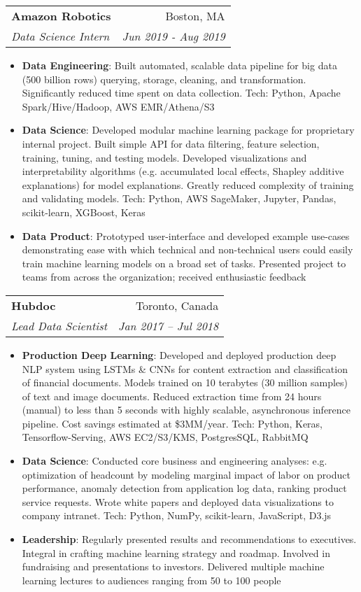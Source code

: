 \documentclass[letterpaper,11pt]{article}
\makeatletter
\newcommand{\resumeItem}[2]{
  \item\small{
    \textbf{#1}{: #2 \vspace{-2pt}}
  }
}
\newcommand{\resumeSubheading}[4]{
  \vspace{-1pt}\item
    \begin{tabular*}{0.97\textwidth}[t]{l@{\extracolsep{\fill}}r}
      \textbf{#1} & #2 \\
      \textit{\small#3} & \textit{\small #4} \\
    \end{tabular*}\vspace{-5pt}
}
\newcommand{\resumeItemListStart}{\begin{itemize}}
\newcommand{\resumeItemListEnd}{\end{itemize}\vspace{-5pt}}
\makeatother
\begin{document}
  \resumeSubheading
    {Amazon Robotics}{Boston, MA}
    {Data Science Intern}{Jun 2019 - Aug 2019}
    \resumeItemListStart
      \resumeItem{Data Engineering}
        {Built automated, scalable data pipeline for big data (500 billion rows) querying, storage, cleaning,
        and transformation. Significantly reduced time spent on data collection. Tech: Python, Apache Spark/Hive/Hadoop, AWS EMR/Athena/S3}
      \resumeItem{Data Science}
        {Developed modular machine learning package for proprietary internal project. Built simple API for data filtering,
        feature selection, training, tuning, and testing models. Developed visualizations and interpretability algorithms
        (e.g. accumulated local effects, Shapley additive explanations) for model explanations. Greatly reduced complexity
        of training and validating models. Tech: Python, AWS SageMaker, Jupyter, Pandas, scikit-learn, XGBoost, Keras}
      \resumeItem{Data Product}
        {Prototyped user-interface and developed example use-cases demonstrating ease with which technical and non-technical
        users could easily train machine learning models on a broad set of tasks. Presented project to teams from across
        the organization; received enthusiastic feedback}
    \resumeItemListEnd

    \resumeSubheading
      {Hubdoc}{Toronto, Canada}
      {Lead Data Scientist}{Jan 2017 -- Jul 2018}
      \resumeItemListStart
        \resumeItem{Production Deep Learning}
          {Developed and deployed production deep NLP system using LSTMs \& CNNs for content extraction and
          classification of financial documents. Models trained on 10 terabytes (30 million samples) of text and image documents.
          Reduced extraction time from 24 hours (manual) to less than 5 seconds with highly scalable, asynchronous inference pipeline.
          Cost savings estimated at \$3MM/year. Tech: Python, Keras, Tensorflow-Serving, AWS EC2/S3/KMS, PostgresSQL, RabbitMQ}
        \resumeItem{Data Science}
          {Conducted core business and engineering analyses: e.g. optimization of headcount by modeling marginal impact of labor
          on product performance, anomaly detection from application log data, ranking product service requests. Wrote white papers and
          deployed data visualizations to company intranet. Tech: Python, NumPy, scikit-learn, JavaScript, D3.js}
        \resumeItem{Leadership}
          {Regularly presented results and recommendations to executives. Integral in crafting machine learning strategy and
          roadmap. Involved in fundraising and presentations to investors. Delivered multiple machine learning lectures to
          audiences ranging from 50 to 100 people}
      \resumeItemListEnd
\end{document}
